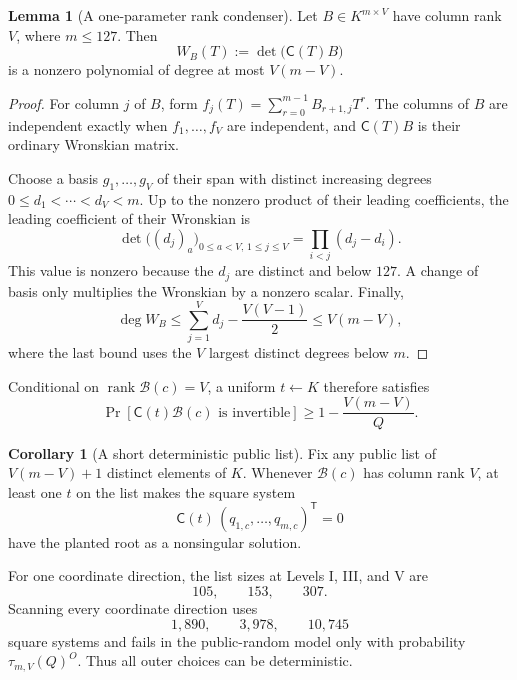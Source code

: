 \documentclass[11pt,a4paper]{article}
\theoremstyle{definition}
\newtheorem{lemma}[theorem]{Lemma}
\newtheorem{corollary}[theorem]{Corollary}
\theoremstyle{remark}
\newcommand{\rank}{\operatorname{rank}}
\begin{document}
\begin{lemma}[A one-parameter rank condenser]\label{lem:wronskian-condenser}
Let $B\in K^{m\times V}$ have column rank $V$, where $m\le127$.  Then
\begin{equation}\label{eq:wronskian-polynomial}
 W_B(T):=\det\bigl(\mathsf C(T)B\bigr)
\end{equation}
is a nonzero polynomial of degree at most $V(m-V)$.
\end{lemma}

\begin{proof}
For column $j$ of $B$, form
$f_j(T)=\sum_{r=0}^{m-1}B_{r+1,j}T^r$.  The columns of $B$ are independent
exactly when $f_1,\ldots,f_V$ are independent, and $\mathsf C(T)B$ is their
ordinary Wronskian matrix.

Choose a basis $g_1,\ldots,g_V$ of their span with distinct increasing degrees
$0\le d_1<\cdots<d_V<m$.  Up to the nonzero product of their leading
coefficients, the leading coefficient of their Wronskian is
\[
 \det\bigl((d_j)_a\bigr)_{0\le a<V,\,1\le j\le V}
 =\prod_{i<j}(d_j-d_i).
\]
This value is nonzero because the $d_j$ are distinct and below $127$.  A
change of basis only multiplies the Wronskian by a nonzero scalar.  Finally,
\[
 \deg W_B
 \le \sum_{j=1}^V d_j-\frac{V(V-1)}2
 \le V(m-V),
\]
where the last bound uses the $V$ largest distinct degrees below $m$.
\end{proof}

Conditional on $\rank\mathcal B(c)=V$, a uniform $t\leftarrow K$ therefore
satisfies
\begin{equation}\label{eq:random-recombination-success}
 \Pr[\mathsf C(t)\mathcal B(c)\text{ is invertible}]
 \ge1-\frac{V(m-V)}Q.
\end{equation}

\begin{corollary}[A short deterministic public list]\label{cor:deterministic-outer-list}
Fix any public list of $V(m-V)+1$ distinct elements of $K$.  Whenever
$\mathcal B(c)$ has column rank $V$, at least one $t$ on the list makes the
square system
\begin{equation}\label{eq:condensed-direction-system}
 \mathsf C(t)\,(q_{1,c},\ldots,q_{m,c})^{\mathsf T}=0
\end{equation}
have the planted root as a nonsingular solution.

For one coordinate direction, the list sizes at Levels I, III, and V are
\[
 105,\qquad153,\qquad307.
\]
Scanning every coordinate direction uses
\[
 1{,}890,\qquad3{,}978,\qquad10{,}745
\]
square systems and fails in the public-random model only with probability
$\tau_{m,V}(Q)^O$.  Thus all outer choices can be deterministic.
\end{corollary}
\end{document}
